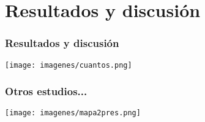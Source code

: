\documentclass[compress]{beamer}
\begin{document}



\section{Resultados y discusión}

{
\begin{frame}
\frametitle{Resultados y discusión}
\begin{center}
\texttt{[image: imagenes/cuantos.png]}

\end{center}
\end{frame}
}

{
\begin{frame}
\frametitle{Otros estudios...}
\vspace{-0.5cm}

\begin{center}
\hspace*{-1cm}\texttt{[image: imagenes/mapa2pres.png]}\\

\end{center}

\end{frame}
}





\end{document}
